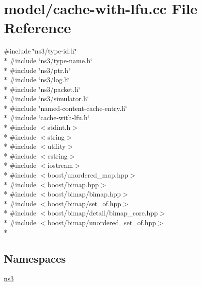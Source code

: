 \hypertarget{cache-with-lfu_8cc}{\section{model/cache-\/with-\/lfu.cc File Reference}
\label{cache-with-lfu_8cc}
}
{\ttfamily \#include \char`\"{}ns3/type-\/id.\-h\char`\"{}}\\*
{\ttfamily \#include \char`\"{}ns3/type-\/name.\-h\char`\"{}}\\*
{\ttfamily \#include \char`\"{}ns3/ptr.\-h\char`\"{}}\\*
{\ttfamily \#include \char`\"{}ns3/log.\-h\char`\"{}}\\*
{\ttfamily \#include \char`\"{}ns3/packet.\-h\char`\"{}}\\*
{\ttfamily \#include \char`\"{}ns3/simulator.\-h\char`\"{}}\\*
{\ttfamily \#include \char`\"{}named-\/content-\/cache-\/entry.\-h\char`\"{}}\\*
{\ttfamily \#include \char`\"{}cache-\/with-\/lfu.\-h\char`\"{}}\\*
{\ttfamily \#include $<$stdint.\-h$>$}\\*
{\ttfamily \#include $<$string$>$}\\*
{\ttfamily \#include $<$utility$>$}\\*
{\ttfamily \#include $<$cstring$>$}\\*
{\ttfamily \#include $<$iostream$>$}\\*
{\ttfamily \#include $<$boost/unordered\-\_\-map.\-hpp$>$}\\*
{\ttfamily \#include $<$boost/bimap.\-hpp$>$}\\*
{\ttfamily \#include $<$boost/bimap/bimap.\-hpp$>$}\\*
{\ttfamily \#include $<$boost/bimap/set\-\_\-of.\-hpp$>$}\\*
{\ttfamily \#include $<$boost/bimap/detail/bimap\-\_\-core.\-hpp$>$}\\*
{\ttfamily \#include $<$boost/bimap/unordered\-\_\-set\-\_\-of.\-hpp$>$}\\*
\subsection*{Namespaces}
\begin{DoxyCompactItemize}
\item 
\hyperlink{namespacens3}{ns3}
\end{DoxyCompactItemize}
